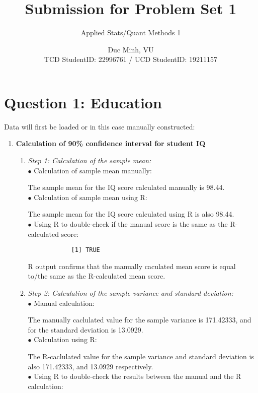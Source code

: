 \documentclass[12pt,letterpaper]{article}
\title{Submission for Problem Set 1}
\date{Duc Minh, VU \\
TCD StudentID: 22996761 / UCD StudentID: 19211157}
\author{Applied Stats/Quant Methods 1}
\begin{document}
\maketitle
\section*{Question 1: Education}
\noindent Data will first be loaded or in this case manually constructed: 



\begin{enumerate} 
	\item \textbf{Calculation of 90\% confidence interval for student IQ}
	\begin{enumerate}
		\item \textit{Step 1: Calculation of the sample mean:}\\
		$\bullet$ Calculation of sample mean manually:
			
		The sample mean for the IQ score calculated manually is 98.44. \\
		$\bullet$ Calculation of sample mean using R:
			
		The sample mean for the IQ score calculated using R is also 98.44. \\
		$\bullet$ Using R to double-check if the manual score is the same as the R-calculated score:
			
		\begin{verbatim}
			[1] TRUE
		\end{verbatim}
		R output confirms that the manually caculated mean score is equal to/the same as the R-calculated mean score.
		\item \textit{Step 2: Calculation of the sample variance and standard deviation:}\\
		$\bullet$ Manual calculation:
			
		The manually caclulated value for the sample variance is 171.42333, and for the standard deviation is 13.0929. \\
		$\bullet$ Calculation using R:
			
		The R-caclulated value for the sample variance and standard deviation is also 171.42333, and 13.0929 respectively.\\
		$\bullet$ Using R to double-check the results between the manual and the R calculation:

\end{enumerate}
\end{enumerate}
\end{document}
